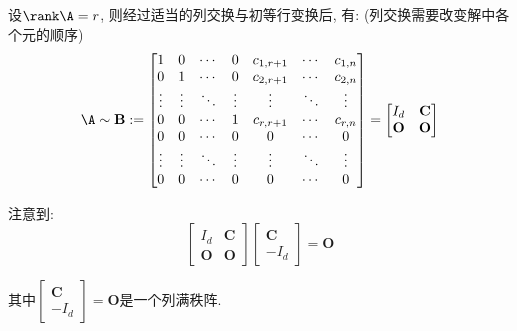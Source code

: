 \documentclass[UTF8]{ctexart}
\begin{document}
		设$\rank\A=r$, 则经过适当的列交换与初等行变换后, 有: (列交换需要改变解中各个元的顺序)
		\[\A\sim\mathbf{B}:=
		\begin{bmatrix}
			1 & 0 & \cdots & 0 & c_{1,r+1} & \cdots & c_{1,n}\\
			0 & 1 & \cdots & 0 & c_{2,r+1} & \cdots & c_{2,n}\\
			\vdots & \vdots & \ddots & \vdots & \vdots & \ddots & \vdots\\
			0 & 0 & \cdots & 1 & c_{r,r+1} & \cdots & c_{r,n}\\
			0 & 0 & \cdots & 0 & 0 & \cdots & 0\\
			\vdots & \vdots & \ddots & \vdots & \vdots & \ddots & \vdots\\
			0 & 0 & \cdots & 0 & 0 & \cdots & 0\\
		\end{bmatrix}
		=
		\begin{bmatrix}
			I_d & \mathbf{C}\\
			\mathbf{O} & \mathbf{O}
		\end{bmatrix}\]

		注意到: 
		\[\begin{bmatrix}
			I_d & \mathbf{C}\\
			\mathbf{O} & \mathbf{O}
		\end{bmatrix}
		\begin{bmatrix}
			\mathbf{C}\\
			-I_d
		\end{bmatrix}=\mathbf{O}\]

		其中$\begin{bmatrix}
			\mathbf{C}\\
			-I_d
		\end{bmatrix}=\mathbf{O}$是一个列满秩阵. 
\end{document}
